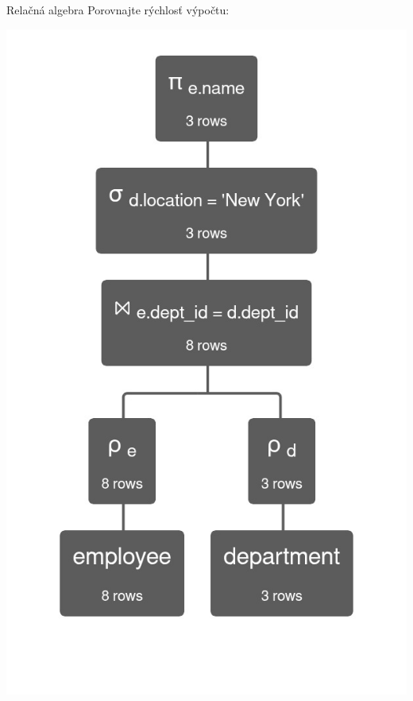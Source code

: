 \documentclass[12pt]{beamer}
\begin{document}
\begin{frame}[fragile]{Relačná algebra}
Porovnajte rýchlosť výpočtu:\\
\begin{minipage}{.45\textwidth}
\includegraphics[scale=.18]{query3.jpg}
\end{minipage}
\begin{minipage}{.45\textwidth}

\end{minipage}
\end{frame}
\end{document}
